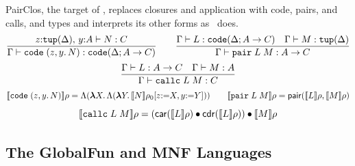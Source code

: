 PairClos, the target of , replaces closures and application with code, pairs, and calls, and types and interprets its other forms as \fpc\ does.
{\small\figdefs
{}
\[
  \dfrac{z{:}\mathtt{tup}(\Delta),\, y{:}A \vdash N : C}
        {\Gamma \vdash \mathtt{code}\;(z, y.\,N) : \mathtt{code}(\Delta; A \rightarrow C)}
  \qquad
  \dfrac{\Gamma \vdash L : \mathtt{code}(\Delta; A \rightarrow C)
         \quad \Gamma \vdash M : \mathtt{tup}(\Delta)}
        {\Gamma \vdash \mathtt{pair}\;L\;M : A \rightarrow C}
\]
\[
  \dfrac{\Gamma \vdash L : A \rightarrow C \quad \Gamma \vdash M : A}
        {\Gamma \vdash \mathtt{callc}\;L\;M : C}
\]
}
{\small\figdefs
{}
\[
  \llbracket \mathtt{code}\;(z, y.\,N) \rrbracket\rho =  \Lambda(\boldsymbol{\lambda} X.\, \Lambda(\boldsymbol{\lambda} Y.\, \llbracket N \rrbracket\rho_0[z{:=}X, y{:=}Y]))
  \qquad
  \llbracket \mathtt{pair}\;L\;M \rrbracket\rho = \mathsf{pair}(\llbracket L \rrbracket\rho, \llbracket M \rrbracket\rho)
\]
\[
  \llbracket \mathtt{callc}\;L\;M \rrbracket\rho = (\mathsf{car}(\llbracket L \rrbracket\rho) \mathbin{\bullet} \mathsf{cdr}(\llbracket L \rrbracket\rho)) \mathbin{\bullet} \llbracket M \rrbracket\rho
\]
}

\subsection{The GlobalFun and MNF Languages}

